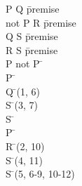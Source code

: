 \documentclass{article}
\begin{document}
\begin{proofbox}
\: P \rightarrow Q \= \hbox{premise} \\
\: not P \rightarrow R \= \hbox{premise} \\
\: Q \rightarrow S \= \hbox{premise} \\
\: R \rightarrow S \= \hbox{premise} \\
\: P \lor not P \= \lem \\
\openAlt
\: P \= \asm \\
\: Q \= \implieselim(1, 6) \\
\: S \= \implieselim(3, 7) \\
\: S \=  \\
\splitAlt
\: \lnot P \= \asm \\
\: R \= \implieselim(2, 10) \\
\: S \= \implieselim(4, 11) \\
\closeAlt
\: S \= \orelim(5, 6-9, 10-12) \\
\end{proofbox}
\end{document}
